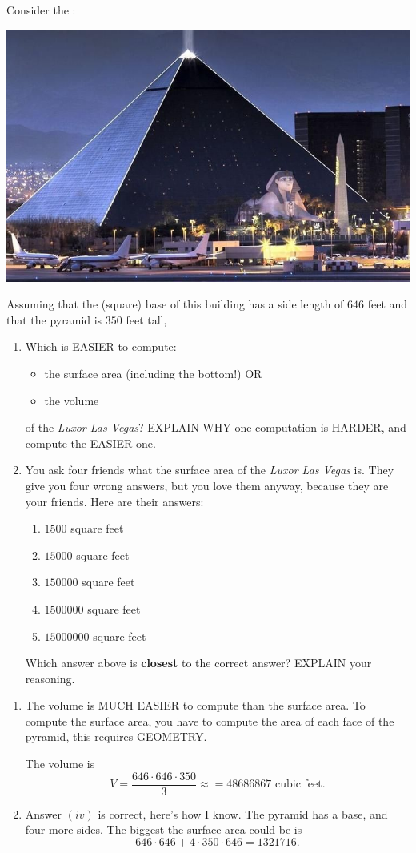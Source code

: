 \documentclass[nooutcomes,noauthor,hints]{ximera}
\begin{document}
\begin{question}
  Consider the :
  \begin{center}
    \includegraphics[width=.4\textwidth]{pyramid.jpg} 
  \end{center}
 Assuming that the (square) base of this building has a side length of
 $646$ feet and that the pyramid is $350$ feet tall,
  \begin{enumerate}
  \item Which is EASIER to compute:
    \begin{itemize}
    \item the surface area (including the bottom!) OR
    \item the volume
    \end{itemize}
    of the \textit{Luxor Las Vegas}? EXPLAIN WHY one computation is
    HARDER, and compute the EASIER one.
  \item You ask four friends what the surface area of the
    \textit{Luxor Las Vegas} is. They give you four wrong answers, but
    you love them anyway, because they are your friends. Here are
    their answers:
    \begin{enumerate}
    \item $1500$ square feet
    \item $15000$ square feet
    \item $150000$ square feet
    \item $1500000$ square feet
    \item $15000000$ square feet
    \end{enumerate}
    Which answer above is \textbf{closest} to the correct answer? EXPLAIN your reasoning.
  \end{enumerate}
  \begin{freeResponse}
    \begin{enumerate}
      \item The volume is MUCH EASIER to compute than the surface
        area. To compute the surface area, you have to compute the
        area of each face of the pyramid, this requires GEOMETRY.

        The volume is
        \[
        V = \frac{646\cdot 646\cdot 350}{3} \approx = 48686867 \text{ cubic feet}.
        \]
      \item Answer $(iv)$ is correct, here's how I know. The pyramid
        has a base, and four more sides. The biggest the surface area could be is
        \[
        646\cdot 646+ 4\cdot 350\cdot 646 = 1321716.
        \]
    \end{enumerate}
  \end{freeResponse}
\end{question}
\mynewpage
\end{document}
